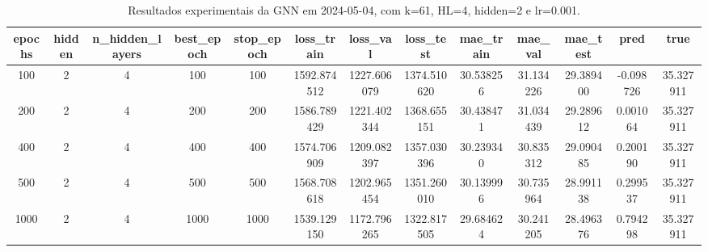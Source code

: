 \begin{table}[h]
\centering
\caption{Resultados experimentais da GNN em 2024-05-04, com k=61, HL=4, hidden=2 e lr=0.001.}
\label{tab:gnn_results_k61_hl4_h2_d20240504}
\begin{tabular}{ccccccccccccc}
\toprule
epochs & hidden & n\_hidden\_layers & best\_epoch & stop\_epoch & loss\_train & loss\_val & loss\_test & mae\_train & mae\_val & mae\_test & pred & true \\
\midrule
100 & 2 & 4 & 100 & 100 & 1592.874512 & 1227.606079 & 1374.510620 & 30.538256 & 31.134226 & 29.389400 & -0.098726 & 35.327911 \\
200 & 2 & 4 & 200 & 200 & 1586.789429 & 1221.402344 & 1368.655151 & 30.438471 & 31.034439 & 29.289612 & 0.001064 & 35.327911 \\
400 & 2 & 4 & 400 & 400 & 1574.706909 & 1209.082397 & 1357.030396 & 30.239340 & 30.835312 & 29.090485 & 0.200190 & 35.327911 \\
500 & 2 & 4 & 500 & 500 & 1568.708618 & 1202.965454 & 1351.260010 & 30.139996 & 30.735964 & 28.991138 & 0.299537 & 35.327911 \\
1000 & 2 & 4 & 1000 & 1000 & 1539.129150 & 1172.796265 & 1322.817505 & 29.684624 & 30.241205 & 28.496376 & 0.794298 & 35.327911 \\
\bottomrule
\end{tabular}
\end{table}
